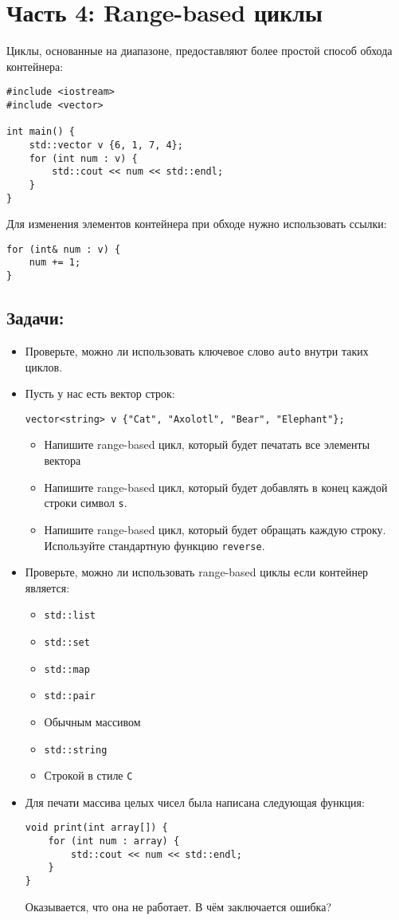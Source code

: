 \documentclass{article}
\begin{document}
\newpage
\section*{Часть 4: Range-based циклы}
Циклы, основанные на диапазоне, предоставляют более простой способ обхода контейнера:
\begin{lstlisting}
#include <iostream>
#include <vector>

int main() {
    std::vector v {6, 1, 7, 4};
    for (int num : v) {
    	std::cout << num << std::endl;    
    }
}
\end{lstlisting}
Для изменения элементов контейнера при обходе нужно использовать ссылки:
\begin{lstlisting}
for (int& num : v) {
    num += 1;    
}
\end{lstlisting}

\subsection*{Задачи:}
\begin{itemize}
\item Проверьте, можно ли использовать ключевое слово \texttt{auto} внутри таких циклов.
\item Пусть у нас есть вектор строк:
\begin{lstlisting}
vector<string> v {"Cat", "Axolotl", "Bear", "Elephant"};
\end{lstlisting}
\begin{itemize}
\item Напишите range-based цикл, который будет печатать все элементы вектора
\item Напишите range-based цикл, который будет добавлять в конец каждой строки символ \texttt{s}.
\item Напишите range-based цикл, который будет обращать каждую строку. Используйте стандартную функцию \texttt{reverse}.
\end{itemize}

\item Проверьте, можно ли использовать range-based циклы если контейнер является:
\begin{multicols}{2}
\begin{itemize}
\item \texttt{std::list}
\item \texttt{std::set}
\item \texttt{std::map}
\item \texttt{std::pair}
\item Обычным массивом
\item \texttt{std::string}
\item Строкой в стиле \texttt{C}
\end{itemize}
\end{multicols}

\item Для печати массива целых чисел была написана следующая функция:
\begin{lstlisting}
void print(int array[]) {
    for (int num : array) {
        std::cout << num << std::endl;
    }
}
\end{lstlisting}
Оказывается, что она не работает. В чём заключается ошибка?
\end{itemize}
\end{document}
